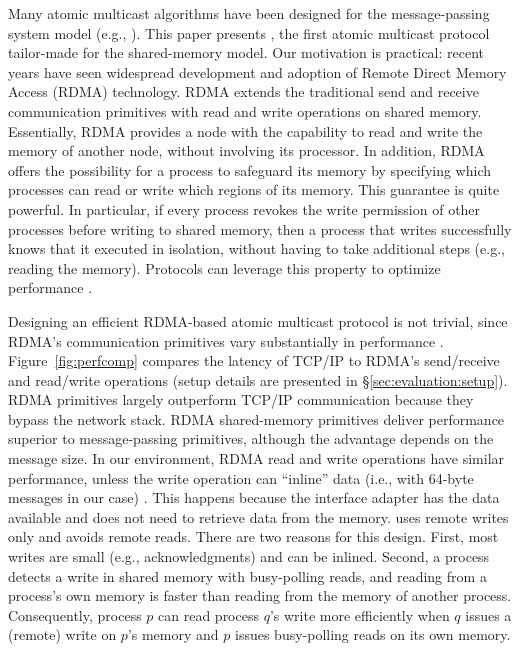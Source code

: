 Many atomic multicast algorithms have been designed for the message-passing system model (e.g., \cite{Coelho2017,gotsman2019white,birman1987reliable, delporte2000fault, bezerra2015ridge,
marandi2012multi}).
This paper presents \libname, the first atomic multicast protocol tailor-made for the shared-memory model.
Our motivation is practical: recent years have seen widespread development and adoption of Remote Direct Memory Access (RDMA) technology.
RDMA extends the traditional send and receive communication primitives with read and write operations on shared memory.
Essentially, RDMA provides a node with the capability to read and write the memory of another node, without involving its processor.
In addition, RDMA offers the possibility for a process to safeguard its memory by specifying which processes can read or write which regions of its memory.
This guarantee is quite powerful.
In particular, if every process revokes the write permission of other processes before writing to shared memory, then a process that writes successfully knows that it executed in isolation, without having to take additional steps (e.g., reading the memory). 
Protocols can leverage this property to optimize performance \cite{Aguilera2019}.

Designing an efficient RDMA-based atomic multicast protocol is not trivial, since RDMA's communication primitives vary substantially in performance \cite{Kalia2014,mitchell2013using}.
Figure~\ref{fig:perfcomp} compares the latency of TCP/IP to RDMA's send/receive and read/write operations (setup details are presented in \S\ref{sec:evaluation:setup}).
RDMA primitives largely outperform TCP/IP communication because they bypass the network stack.
RDMA shared-memory primitives deliver performance superior to message-passing primitives, although the advantage depends on the message size.
In our environment, RDMA read and write operations have similar performance, unless the write operation can ``inline'' data (i.e., with 64-byte messages in our case) \cite{mitchell2013using}.
This happens because the interface adapter has the data available and does not need to retrieve data from the memory.
\libname uses remote writes only and avoids remote reads.
There are two reasons for this design.
First, most writes are small (e.g., acknowledgments) and can be inlined.
Second, a process detects a write in shared memory with busy-polling reads, and reading from a process's own memory is faster than reading from the memory of another process.
Consequently, process $p$ can read process $q$'s write more efficiently when $q$ issues a (remote) write on $p$'s memory and $p$ issues busy-polling reads on its own memory.  

